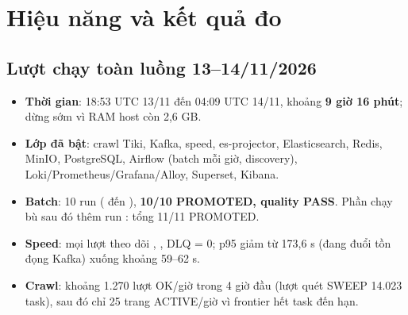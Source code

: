 \chapter{Hiệu năng và kết quả đo}\label{chap:perf}

\section{Lượt chạy toàn luồng 13--14/11/2026}
\begin{itemize}
  \item \textbf{Thời gian}: 18:53 UTC 13/11 đến 04:09 UTC 14/11, khoảng \textbf{9 giờ 16 phút}; dừng sớm vì RAM host còn 2,6 GB.
  \item \textbf{Lớp đã bật}: crawl Tiki, Kafka, speed, es-projector, Elasticsearch, Redis, MinIO, PostgreSQL, Airflow (batch mỗi giờ, discovery),
        Loki/Prometheus/Grafana/Alloy, Superset, Kibana.
  \item \textbf{Batch}: 10 run ( đến ), \textbf{10/10 PROMOTED, quality PASS}.
        Phần chạy bù sau đó thêm run : tổng 11/11 PROMOTED.
  \item \textbf{Speed}: mọi lượt theo dõi , , DLQ = 0; p95 giảm từ 173,6 s (đang đuổi tồn đọng Kafka) xuống khoảng 59--62 s.
  \item \textbf{Crawl}: khoảng 1.270 lượt OK/giờ trong 4 giờ đầu (lượt quét SWEEP 14.023 task), sau đó chỉ 25 trang ACTIVE/giờ vì frontier hết task đến hạn.
\end{itemize}

